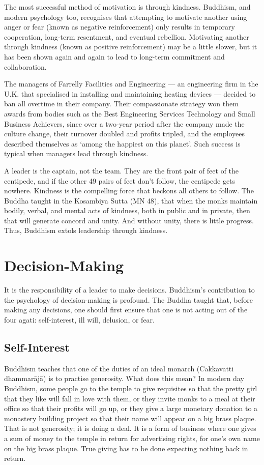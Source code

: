 ﻿\documentclass[11pt, openany]{book}
\begin{document}
The most successful method of motivation is through kindness. Buddhism, and modern psychology too, recognises that attempting to motivate another using anger or fear (known as negative reinforcement) only results in temporary cooperation, long-term resentment, and eventual rebellion. Motivating another through kindness (known as positive reinforcement) may be a little slower, but it has been shown again and again to lead to long-term commitment and collaboration.

The managers of Farrelly Facilities and Engineering — an engineering firm in the U.K. that specialised in installing and maintaining heating devices — decided to ban all overtime in their company. Their compassionate strategy won them awards from bodies such as the Best Engineering Services Technology and Small Business Achievers, since over a two-year period after the company made the culture change, their turnover doubled and profits tripled, and the employees described themselves as ‘among the happiest on this planet’. Such success is typical when managers lead through kindness.

A leader is the captain, not the team. They are the front pair of feet of the centipede, and if the other 49 pairs of feet don’t follow, the centipede gets nowhere. Kindness is the compelling force that beckons all others to follow. The Buddha taught in the Kosambiya Sutta (MN 48), that when the monks maintain bodily, verbal, and mental acts of kindness, both in public and in private, then that will generate concord and unity. And without unity, there is little progress. Thus, Buddhism extols leadership through kindness.

\chapter{Decision-Making}

It is the responsibility of a leader to make decisions. Buddhism’s contribution to the psychology of decision-making is profound. The Buddha taught that, before making any decisions, one should first ensure that one is not acting out of the four agati: self-interest, ill will, delusion, or fear.

\section{Self-Interest}

Buddhism teaches that one of the duties of an ideal monarch (Cakkavatti dhammarājā) is to practise generosity. What does this mean? In modern day Buddhism, some people go to the temple to give requisites so that the pretty girl that they like will fall in love with them, or they invite monks to a meal at their office so that their profits will go up, or they give a large monetary donation to a monastery building project so that their name will appear on a big brass plaque. That is not generosity; it is doing a deal. It is a form of business where one gives a sum of money to the temple in return for advertising rights, for one’s own name on the big brass plaque. True giving has to be done expecting nothing back in return.
\end{document}
